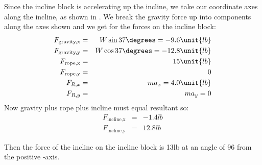 {Since the incline block is accelerating up the incline, we take our
coordinate axes along the incline, as shown in .
We break the gravity force up into components along the axes shown
and we get for the forces on the incline block:
%
\begin{eqnarray*}
F_\text{gravity,x} & = & W \sin{37\degrees} = -9.6\unit{lb}\\
F_\text{gravity,y} & = & W \cos{37\degrees} = -12.8\unit{lb}\\
F_\text{rope,x} & = & 15\unit{lb} \\
F_\text{rope,y} & = & 0 \\
F_{R,x} & = & m a_x = 4.0\unit{lb}\\
F_{R,y} & = & m a_y = 0
\end{eqnarray*}
%
Now gravity plus rope plus incline must equal resultant so:
%
\begin{eqnarray*}
F_\text{incline,x} & = & -1.4\unit{lb}\\
F_\text{incline,y} & = & 12.8\unit{lb}
\end{eqnarray*}

Then the force of the incline on the incline block is 13\unit{lb} at an angle of
{96\degrees} from the positive -axis. 
}%
%

